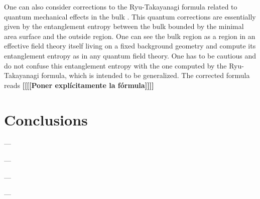 \documentclass[twocolumn]{revtex4}
\begin{document}

One can also consider corrections to the Ryu-Takayanagi formula related to quantum mechanical effects in the bulk \cite{faulkner_quantum_2013}. This quantum corrections are essentially given by the entanglement entropy between the bulk bounded by the minimal area surface and the outside region. One can see the bulk region as a region in an effective field theory itself living on a fixed background geometry and compute its entanglement entropy as in any quantum field theory. One has to be cautious and do not confuse this entanglement entropy with the one computed by the Ryu-Takayanagi formula, which is intended to be generalized. The corrected formula reads {\bf [[[[Poner explícitamente la fórmula]]]]}


\section{Conclusions} \label{s:Conclusions}

---


\begin{acknowledgments}

---

---

---
    
\end{acknowledgments}




\end{document}
